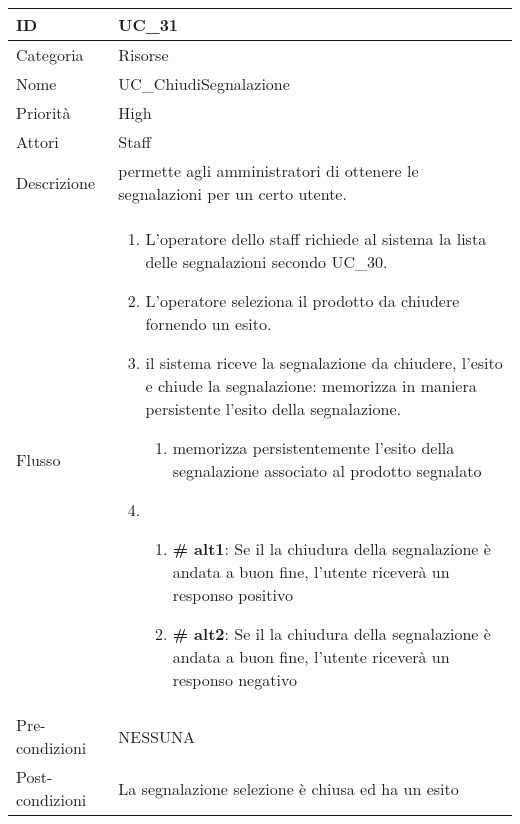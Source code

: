 \begin{center}
\begin{tabular}{ |p{2cm}|p{13cm}|  }
\hline
ID & UC\_31 \\\hline
Categoria & Risorse\\\hline
Nome & UC\_ChiudiSegnalazione\\\hline
Priorità & High \\\hline
Attori &  Staff \\\hline
Descrizione & permette agli amministratori di ottenere le segnalazioni per un certo utente.\\\hline
Flusso &  	\begin{enumerate}
			\item L'operatore dello staff richiede al sistema la lista delle segnalazioni secondo UC\_30.
			\item L'operatore seleziona il prodotto da chiudere fornendo un esito.
			\item il sistema riceve la segnalazione da chiudere, l'esito e chiude la segnalazione: 
			memorizza in maniera persistente l'esito della segnalazione. 
			\begin{enumerate}
			\item memorizza persistentemente l'esito della segnalazione associato al prodotto segnalato
			\end{enumerate}
			\item \begin{enumerate}[label= ]
				\item \textbf{\# alt1}: Se il la chiudura della segnalazione è andata a buon fine, l'utente riceverà un responso positivo
				\item \textbf{\# alt2}: Se il la chiudura della segnalazione è andata a buon fine, l'utente riceverà un responso negativo
			\end{enumerate}
			\end{enumerate}
			\\\hline
Pre-condizioni & NESSUNA\\\hline
Post-condizioni & La segnalazione selezione è chiusa ed ha un esito\\\hline
\end{tabular}
\label{table_use_case:31}\newline


\end{center}
